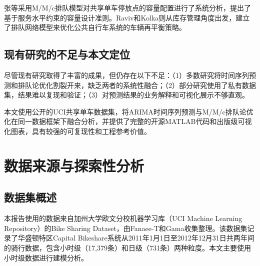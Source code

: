 \documentclass[12pt,a4paper]{article}
\begin{document}
张等\cite{fishman2013}采用M/M/c排队模型对共享单车停放点的容量配置进行了系统分析，提出了基于服务水平约束的容量设计准则。Raviv和Kolka\cite{raviv2013}则从库存管理角度出发，建立了排队网络模型来优化公共自行车系统的车辆再平衡策略。

\subsection{现有研究的不足与本文定位}

尽管现有研究取得了丰富的成果，但仍存在以下不足：（1）多数研究将时间序列预测和排队论优化割裂开来，缺乏两者的系统性融合；（2）部分研究使用了私有数据集，结果难以复现和验证；（3）对预测结果的业务解释和可视化展示不够直观。

本文使用公开的UCI共享单车数据集，将ARIMA时间序列预测与M/M/c排队论优化在同一数据框架下融合分析，并提供了完整的开源MATLAB代码和出版级可视化图表，具有较强的可复现性和工程参考价值。

\section{数据来源与探索性分析}

\subsection{数据集概述}

本报告使用的数据来自加州大学欧文分校机器学习库（UCI Machine Learning Repository）的Bike Sharing Dataset\cite{fanaee2013}，由Fanaee-T和Gama收集整理。该数据集记录了华盛顿特区Capital Bikeshare系统从2011年1月1日至2012年12月31日共两年间的骑行数据，包含小时级（17,379条）和日级（731条）两种粒度。本文主要使用小时级数据进行建模分析。
\end{document}
